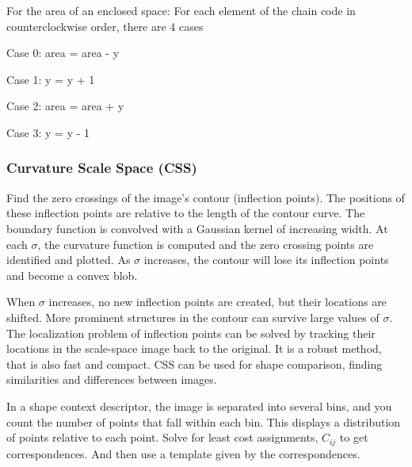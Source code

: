 \documentclass{article}
\begin{document}
\begin{multicols}{2}
  For the area of an enclosed space:
  For each element of the chain code in counterclockwise order, there are 4 cases
  
  \vspace{2mm}
  
  Case 0: area = area - y

  \vspace{2mm}

  Case 1: y = y + 1

  \vspace{2mm}

  Case 2: area = area + y

  \vspace{2mm}

  Case 3: y = y - 1

 \subsubsection{Curvature Scale Space (CSS)}

  Find the zero crossings of the image's contour (inflection points).
  The positions of these inflection points are relative to the length of the contour curve.
  The boundary function is convolved with a Gaussian kernel of increasing width.
  At each $\sigma$, the curvature function is computed and the zero crossing points are identified and plotted.
  As $\sigma$ increases, the contour will lose its inflection points and become a convex blob.
  
  \vspace{5mm}
  
  When $\sigma$ increases, no new inflection points are created, but their locations are shifted.
  More prominent structures in the contour can survive large values of $\sigma$.
  The localization problem of inflection points can be solved by tracking their locations in the scale-space image back to the original.
  It is a robust method, that is also fast and compact.
  CSS can be used for shape comparison, finding similarities and differences between images.

  \vspace{5mm}

  In a shape context descriptor, the image is separated into several bins, and you count the number of points that fall within each bin. This displays a distribution of points relative to each point.
  Solve for least cost assignments, $C_{ij}$ to get correspondences. And then use a template given by the correspondences.


\end{multicols}
\end{document}
